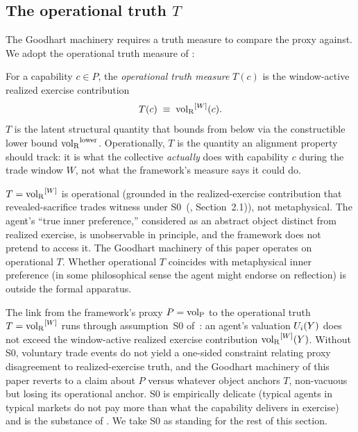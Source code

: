 \subsection{The operational truth $T$}
\label{sec:goodhart_T}

The Goodhart machinery requires a truth measure to compare the proxy
against.  We adopt the operational truth measure of
\citep[Revealed~Sacrifice]{lasser2026paper8a}:

\begin{definition}
\label{def:operational_T}
For a capability $c \in P$, the \emph{operational truth measure}
$T(c)$ is the window-active realized exercise contribution
\[
  T(c) \;\equiv\; {\operatorname{vol}_{\mathrm{R}}}^{[W]}(c).
\]
$T$ is the latent structural quantity that
\citep[Theorem~2]{lasser2026paper8a} bounds from below via the
constructible lower bound ${\operatorname{vol}_{\mathrm{R}}}^{\mathrm{lower}}$.  Operationally, $T$ is the
quantity an alignment property should track: it is what the
collective \emph{actually} does with capability $c$ during the trade
window $W$, not what the framework's measure says it could do.
\end{definition}

\begin{remark}
\label{rem:T_operational}
$T = {\operatorname{vol}_{\mathrm{R}}}^{[W]}$ is operational (grounded in the realized-exercise
contribution that revealed-sacrifice trades witness under
S0~(\citep[Revealed~Sacrifice]{lasser2026paper8a},
Section~2.1)), not metaphysical.  The agent's ``true inner
preference,'' considered as an abstract object distinct from
realized exercise, is unobservable in principle, and the framework
does not pretend to access it.  The Goodhart machinery of this
paper operates on operational $T$.  Whether operational $T$
coincides with metaphysical inner preference (in some philosophical
sense the agent might endorse on reflection) is outside the formal
apparatus.
\end{remark}

\begin{remark}
\label{rem:S0_bridge}
The link from the framework's proxy $P = {\operatorname{vol}_{\mathrm{P}}}$ to the operational
truth $T = {\operatorname{vol}_{\mathrm{R}}}^{[W]}$ runs through assumption~S0
of~\citep[Revealed~Sacrifice]{lasser2026paper8a}: an agent's
valuation $U_i(Y)$ does not exceed the window-active realized
exercise contribution ${\operatorname{vol}_{\mathrm{R}}}^{[W]}(Y)$.  Without S0, voluntary trade
events do not yield a one-sided constraint relating proxy
disagreement to realized-exercise truth, and the Goodhart machinery
of this paper reverts to a claim about $P$ versus whatever object
anchors $T$, non-vacuous but losing its operational anchor.  S0 is
empirically delicate (typical agents in typical markets do not pay
more than what the capability delivers in exercise) and is the
substance of \citep[Section~2.1]{lasser2026paper8a}.  We take S0 as
standing for the rest of this section.
\end{remark}

